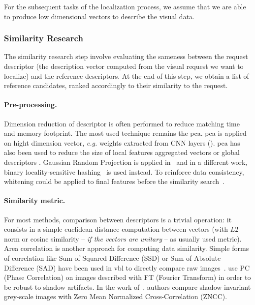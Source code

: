 For the subsequent tasks of the localization process, we assume that we are able to produce low dimensional vectors to describe the visual data.

\subsubsection{Similarity Research}
\label{subsubsec:similarity_research}

The similarity research step involve evaluating the sameness between the request descriptor (\ie the description vector computed from the visual request we want to localize) and the reference descriptors. At the end of this step, we obtain a list of reference candidates, ranked accordingly to their similarity to the request.

\paragraph{Pre-processing.}
Dimension reduction of descriptor is often performed to reduce matching time and memory footprint. The most used technique remains the \ac{pca}. \ac{pca} is applied on hight dimension vector, \textit{e.g.} weights extracted from CNN layers (\citep{Arandjelovic2017,Gordo2016}). \ac{pca} has also been used to reduce the size of local features aggregated vectors \citep{Kim2015,Torii2015} or global descriptors \citep{Ni2009}. Gaussian Random Projection is applied in~\citep{Sunderhauf2015a,Panphattarasap2016} and in a different work, binary locality-sensitive hashing~\citep{Sunderhauf2015} is used instead. To reinforce data consistency, whitening could be applied to final features before the similarity search~\citep{Jegou2012a,Gong2014,Tolias2016,Arandjelovic2017,Gordo2016,Radenovic2016}.

\paragraph{Similarity metric.}
For most methods, comparison between descriptors is a trivial operation: it consists in a simple euclidean distance computation between vectors (with $L2$ norm or cosine similarity -- \textit{if the vectors are unitary} -- as usually used metric). Area correlation is another approach for computing data similarity. Simple forms of correlation like Sum of Squared Difference (SSD) or Sum of Absolute Difference (SAD) have been used in \ac{vbl} to directly compare raw images~\citep{Poglitsch2015,Milford2015}. \citet{Wan2016} use PC (Phase Correlation) on images described with FT (Fourier Transform) in order to be robust to shadow artifacts. In the work of~\citep{Corke2013}, authors compare shadow invariant grey-scale images with Zero Mean Normalized Cross-Correlation (ZNCC).

